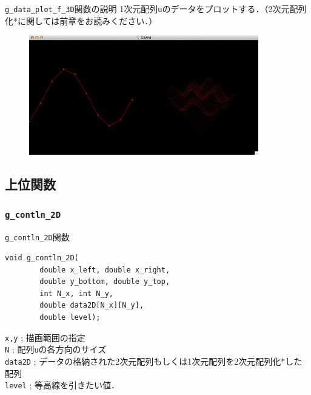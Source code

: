 \documentclass[platex,a4paper,12pt]{jsarticle}%
\begin{document}
\begin{itembox}[l]{\texttt{g\_data\_plot\_f\_3D}関数の説明}
1次元配列\verb|u|のデータをプロットする．（2次元配列化*に関しては前章をお読みください．）
\end{itembox}

\begin{figure}[htb]
\centering
	\includegraphics[width=100mm]{./Figures/eps/Canvas_g_data_plot.eps}
\end{figure}




\clearpage
\subsection{上位関数}
\subsubsection{\texttt{g\_contln\_2D}}

\begin{itembox}[l]{\texttt{g\_contln\_2D}関数}
\begin{verbatim}
void g_contln_2D(
        double x_left, double x_right,
        double y_bottom, double y_top,
        int N_x, int N_y,
        double data2D[N_x][N_y],
        double level);
\end{verbatim}
\verb|x,y| ; 描画範囲の指定\\
\verb|N| ; 配列\verb|u|の各方向のサイズ\\
\verb|data2D| ; データの格納された2次元配列もしくは1次元配列を2次元配列化*した配列\\
\verb|level| ; 等高線を引きたい値．
\end{itembox}
\end{document}
